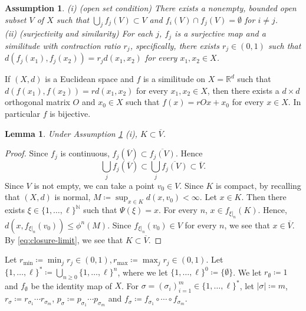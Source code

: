 \documentclass[10pt,a4paper]{amsart}
\newtheorem{Lem}[Thm]{Lemma}
\newtheorem{Ass}[Thm]{Assumption}
\begin{document}
\begin{Ass}\label{ass:additional-f}
(i) (open set condition)  There exists a nonempty, bounded open subset $V$ of $X$ such that $\bigcup_j f_j (V) \subset V$ and 
$f_i (V) \cap f_j (V) = \emptyset$ for $i \ne j$. \\
(ii) (surjectivity and similarity) For each $j$, $f_j$ is a surjective map and a similitude with contraction ratio $r_j$, specifically, 
there exists $r_j \in (0,1)$ such that $d(f_j (x_1), f_j (x_2)) = r_j d(x_1, x_2)$ for every $x_1, x_2 \in X$. 
\end{Ass}

If $(X,d)$ is a Euclidean space and $f$ is a similitude on $X = \mathbb{R}^d$ such that $d(f(x_1), f(x_2)) = r d(x_1, x_2)$ for every $x_1, x_2 \in X$, 
then there exists a $d \times d$ orthogonal matrix $O$ and $x_0 \in X$ such that $f(x) = rOx + x_0$ for every $x \in X$. 
In particular $f$ is bijective. 

\begin{Lem}\label{lem:K-included}
Under Assumption \ref{ass:additional-f} (i), $K \subset \overline{V}$. 
\end{Lem}

\begin{proof}
Since $f_j$ is continuous, $f_j (\overline{V}) \subset \overline{f_j (V)}$. 
Hence  
\[ \bigcup_j f_j (\overline{V}) \subset \bigcup_j \overline{f_j (V)} \subset \overline{V}.\]  
Since $V$ is not empty, we can take a point $v_0 \in V$. 
Since $K$ is compact, by recalling that $(X,d)$ is normal, $M \coloneqq \sup_{x \in K} d(x, v_0) < \infty$. 
Let $x \in K$. 
Then  there exists $\xi \in \{1,\dots, \ell\}^{\mathbb N}$ such that $\Psi(\xi) = x$. 
For every $n$, $x \in f_{\xi|_n} (K)$. 
Hence, $d(x,  f_{\xi|_n}(v_0)) \le \phi^n (M)$. 
Since $ f_{\xi|_n}(v_0) \in V$ for every $n$, we see that $x \in \overline{V}$. 
By \eqref{eq:closure-limit}, we see that $K \subset \overline{V}$. 
\end{proof}

Let $r_{\min} \coloneqq \min_j r_j \in  (0,1), r_{\max} \coloneqq \max_j r_j \in (0,1)$. 
Let $\{1,\dots, \ell\}^{*} \coloneqq \bigcup_{n \ge 0} \{1,\dots, \ell\}^{n}$, where we let $\{1,\dots,\ell\}^{0} \coloneqq \{\emptyset\}$. 
We let $r_{\emptyset} \coloneqq 1$ and $f_{\emptyset}$ be the identity map of $X$. 
For $\sigma = (\sigma_i)_{i=1}^{m} \in  \{1,\dots, \ell\}^{*}$, 
let $|\sigma| \coloneqq m$, $r_{\sigma} \coloneqq r_{\sigma_1} \cdots r_{\sigma_m}$, $p_{\sigma} \coloneqq p_{\sigma_1} \cdots p_{\sigma_m}$ and $f_{\sigma} \coloneqq f_{\sigma_1} \circ \cdots \circ f_{\sigma_m}$. 
\end{document}

